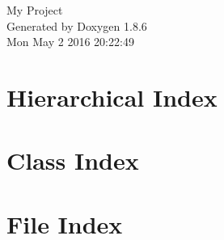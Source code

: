 \documentclass[twoside]{book}
\newcommand{\clearemptydoublepage}{%
  \newpage{\pagestyle{empty}\cleardoublepage}%
}
\begin{document}
\hypersetup{pageanchor=false}
\begin{titlepage}
\vspace*{7cm}
\begin{center}%
{\Large My Project }\\
\vspace*{1cm}
{\large Generated by Doxygen 1.8.6}\\
\vspace*{0.5cm}
{\small Mon May 2 2016 20:22:49}\\
\end{center}
\end{titlepage}
\clearemptydoublepage
\tableofcontents
\clearemptydoublepage
{}
\hypersetup{pageanchor=true}

\chapter{Hierarchical Index}

\chapter{Class Index}

\chapter{File Index}

\end{document}
